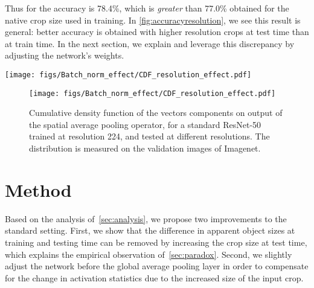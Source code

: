 \documentclass{article}
\begin{document}
Thus for  the accuracy is 78.4\%, which is \emph{greater} than 77.0\% obtained for the native crop size  used in training.
In \cref{fig:accuracyresolution}, we see this result is general: better accuracy is obtained with higher resolution crops at test time than at train time.
In the next section, we explain and leverage this discrepancy by adjusting the network's weights.

\ifnips
    \begin{figure*}
    \begin{minipage}{0.45\linewidth}
    \texttt{[image: figs/Batch\_norm\_effect/CDF\_resolution\_effect.pdf]}
    \end{minipage}
    \hfill
    \vspace{-0.1em}
    \end{figure*}
\else
    \begin{figure}
    \texttt{[image: figs/Batch\_norm\_effect/CDF\_resolution\_effect.pdf]}
    \caption{\label{fig:pdfbatchnormeffect}
        Cumulative density function of the vectors components on output of the spatial average pooling operator, 
        for  a standard ResNet-50 trained at resolution  224, and tested at different resolutions. 
        The distribution is measured on the validation images of Imagenet. 
    }
    \end{figure}
\fi



 \section{Method}\label{sec:approach}

Based on the analysis of~\cref{sec:analysis}, we propose two improvements to the standard setting. 
First, we show that the difference in apparent object sizes at training and testing time can be removed by increasing the crop size at test time, which explains the empirical observation of~\cref{sec:paradox}.
Second, we slightly adjust the network before the global average pooling layer in order to compensate for the change in activation statistics due to the increased size of the input crop.
\end{document}
